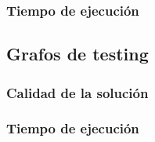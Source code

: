 \documentclass[a4paper, 10pt, twoside]{article}
\begin{document}
\begin{figure}[H]
	
\end{figure}


\subsubsection{Tiempo de ejecución}

\begin{figure}[H]
	
\end{figure}

\begin{figure}[H]
	
\end{figure}

\begin{figure}[H]
	
\end{figure}


\subsection{Grafos de testing}


\subsubsection{Calidad de la solución}

\begin{figure}[H]
	
\end{figure}

\begin{figure}[H]
	
\end{figure}

\begin{figure}[H]
	
\end{figure}


\subsubsection{Tiempo de ejecución}

\begin{figure}[H]
	
\end{figure}

\begin{figure}[H]
	
\end{figure}
\end{document}
